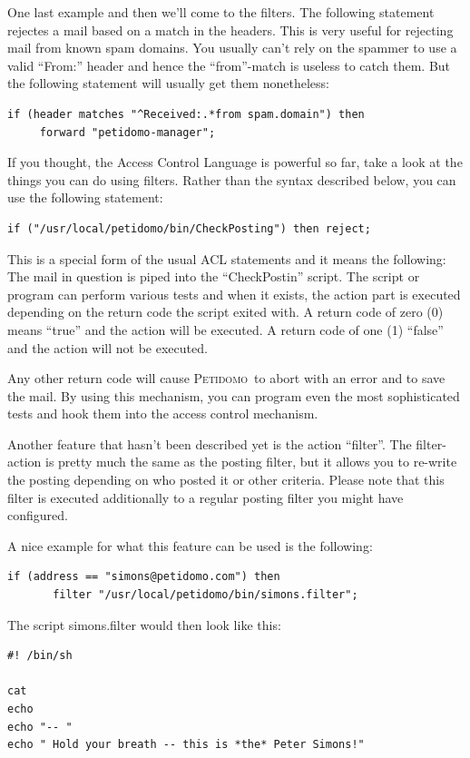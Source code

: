 \documentclass[a4paper,10pt]{scrreprt}
\newcommand{\Petidomo}{{\scshape Peti\-domo}}
\newcommand{\file}[1]{{\sf #1}}
\begin{document}
One last example and then we'll come to the filters. The following
statement rejectes a mail based on a match in the headers. This is
very useful for rejecting mail from known spam domains. You usually
can't rely on the spammer to use a valid ``From:'' header and hence
the ``from''-match is useless to catch them. But the following
statement will usually get them nonetheless:
\begin{verbatim}
if (header matches "^Received:.*from spam.domain") then
     forward "petidomo-manager";
\end{verbatim}

\bigskip

If you thought, the Access Control Language is powerful so far, take a
look at the things you can do using filters. Rather than the syntax
described below, you can use the following statement:
\begin{verbatim}
if ("/usr/local/petidomo/bin/CheckPosting") then reject;
\end{verbatim}

This is a special form of the usual ACL statements and it means the
following: The mail in question is piped into the ``CheckPostin''
script. The script or program can perform various tests and when it
exists, the action part is executed depending on the return code the
script exited with. A return code of zero (0) means ``true'' and the
action will be executed. A return code of one (1) ``false'' and the
action will not be executed.

Any other return code will cause \Petidomo\ to abort with an error and
to save the mail. By using this mechanism, you can program even the
most sophisticated tests and hook them into the access control
mechanism.

Another feature that hasn't been described yet is the action
``filter''. The filter-action is pretty much the same as the posting
filter, but it allows you to re-write the posting depending on who
posted it or other criteria. Please note that this filter is executed
additionally to a regular posting filter you might have configured.

A nice example for what this feature can be used is the following:
\begin{verbatim}
if (address == "simons@petidomo.com") then
       filter "/usr/local/petidomo/bin/simons.filter";
\end{verbatim}

The script \file{simons.filter} would then look like this:
\begin{verbatim}
#! /bin/sh

cat
echo
echo "-- "
echo " Hold your breath -- this is *the* Peter Simons!"
\end{verbatim}
\end{document}
